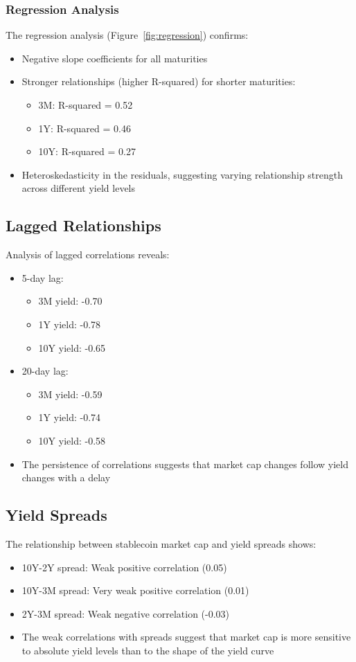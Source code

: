 \documentclass[12pt,a4paper]{article}
\begin{document}
\subsubsection{Regression Analysis}
The regression analysis (Figure~\ref{fig:regression}) confirms:
\begin{itemize}
    \item Negative slope coefficients for all maturities
    \item Stronger relationships (higher R-squared) for shorter maturities:
    \begin{itemize}
        \item 3M: R-squared = 0.52
        \item 1Y: R-squared = 0.46
        \item 10Y: R-squared = 0.27
    \end{itemize}
    \item Heteroskedasticity in the residuals, suggesting varying relationship strength across different yield levels
\end{itemize}

\subsection{Lagged Relationships}
Analysis of lagged correlations reveals:
\begin{itemize}
    \item 5-day lag:
    \begin{itemize}
        \item 3M yield: -0.70
        \item 1Y yield: -0.78
        \item 10Y yield: -0.65
    \end{itemize}
    \item 20-day lag:
    \begin{itemize}
        \item 3M yield: -0.59
        \item 1Y yield: -0.74
        \item 10Y yield: -0.58
    \end{itemize}
    \item The persistence of correlations suggests that market cap changes follow yield changes with a delay
\end{itemize}

\subsection{Yield Spreads}
The relationship between stablecoin market cap and yield spreads shows:
\begin{itemize}
    \item 10Y-2Y spread: Weak positive correlation (0.05)
    \item 10Y-3M spread: Very weak positive correlation (0.01)
    \item 2Y-3M spread: Weak negative correlation (-0.03)
    \item The weak correlations with spreads suggest that market cap is more sensitive to absolute yield levels than to the shape of the yield curve
\end{itemize}
\end{document}
